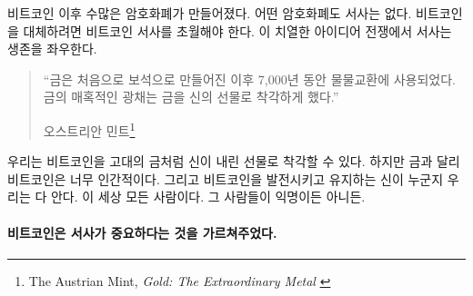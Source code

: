 비트코인 이후 수많은 암호화폐가 만들어졌다. 
어떤 암호화폐도 서사는 없다.
비트코인을 대체하려면 비트코인 서사를 초월해야 한다. 
이 치열한 아이디어 전쟁에서 서사는 생존을 좌우한다.

\begin{quotation}\begin{samepage}
		\enquote{금은 처음으로 보석으로 만들어진 이후 7,000년 동안 물물교환에 사용되었다. 금의 매혹적인 광채는 금을 신의 선물로 착각하게 했다.}
		\begin{flushright} 오스트리안 민트\footnote{The Austrian Mint, \textit{Gold: The Extraordinary Metal} \cite{gold-gift-gods}}
\end{flushright}\end{samepage}\end{quotation}

우리는 비트코인을 고대의 금처럼 신이 내린 선물로 착각할 수 있다. 
하지만 금과 달리 비트코인은 너무 인간적이다. 
그리고 비트코인을 발전시키고 유지하는 신이 누군지 우리는 다 안다. 
이 세상 모든 사람이다. 그 사람들이 익명이든 아니든.

\paragraph{비트코인은 서사가 중요하다는 것을 가르쳐주었다.}

%
%
%
%
